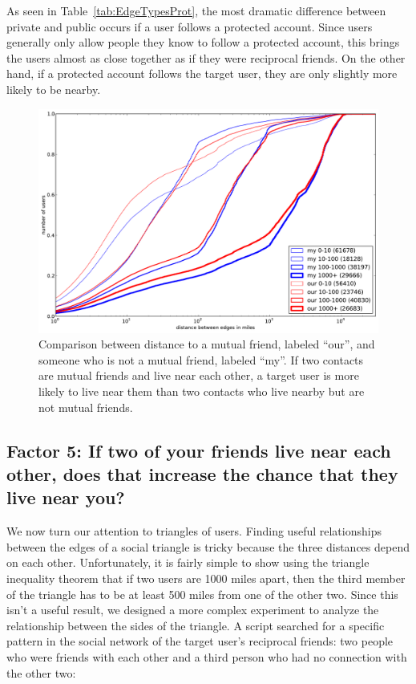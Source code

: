 \documentclass[letterpaper]{article}
\begin{document}
As seen in Table~\ref{tab:EdgeTypesProt}, the most dramatic difference between
private and public occurs if a user follows a protected account.
%
Since users generally only allow people they know to follow a protected
account, this brings the users almost as close together as if they were
reciprocal friends.
%
On the other hand, if a protected account follows the target user, they
are only slightly more likely to be nearby.

\begin{figure}[tbh]
\centering
\includegraphics[width=.9\linewidth]{figures/near_triads.pdf}
\caption{
Comparison between distance to a mutual friend, labeled ``our'', and someone
who is not a mutual friend, labeled ``my''.
If two contacts are mutual friends and live near each other, a target user is
more likely to live near them than two contacts who live nearby but are not
mutual friends.
}
\label{fig:NearTriads}
\end{figure}

\subsection{Factor 5: If two of your friends live near each other, does that increase the
chance that they live near you?}

We now turn our attention to triangles of users.
Finding useful relationships between the edges of a social triangle is tricky
because the three distances depend on each other.
Unfortunately, it is fairly simple to show using the triangle inequality theorem
that if two users are 1000 miles apart, then the third member of the triangle
has to be at least 500 miles from one of the other two.
Since this isn't a useful result, we designed a more complex experiment to
analyze the relationship between the sides of the triangle.
A script searched for a specific pattern in the social network of
the target user's reciprocal friends: two people who were friends with each
other and a third person who had no connection with the other two:
\end{document}
